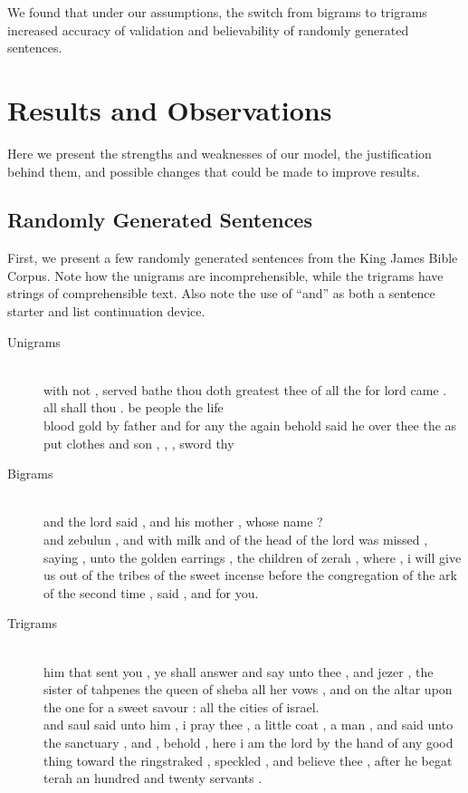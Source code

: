 \documentclass[12pt]{article}
\begin{document}
We found that under our assumptions, the switch from bigrams to trigrams increased accuracy of validation and believability of randomly generated sentences.

\section{Results and Observations}
Here we present the strengths and weaknesses of our model, the justification behind them, and possible changes that could be made to improve results.

\subsection{Randomly Generated Sentences}
First, we present a few randomly generated sentences from the King James Bible Corpus. Note how the unigrams are incomprehensible, while the trigrams have strings of comprehensible text. Also note the  use of ``and'' as both a sentence starter and list continuation device.
\begin{description}
\item[Unigrams]\hfill\\
with not , served bathe thou doth greatest thee of all the for lord came . all shall thou . be people the life
\\
blood gold by father and for any the again behold said he over thee the as put clothes and son , , , sword thy
\item[Bigrams]\hfill\\
and the lord said , and his mother , whose name ?
\\
and zebulun , and with milk and of the head of the lord was missed , saying , unto the golden earrings , the children of zerah , where , i will give us out of the tribes of the sweet incense before the congregation of the ark of the second time , said , and for you.
\item[Trigrams]\hfill\\
him that sent you , ye shall answer and say unto thee , and jezer , the sister of tahpenes the queen of sheba all her vows , and on the altar upon the one for a sweet savour : all the cities of israel.
\\
and saul said unto him , i pray thee , a little coat , a man , and said unto the sanctuary , and , behold , here i am the lord by the hand of any good thing toward the ringstraked , speckled , and believe thee , after he begat terah an hundred and twenty servants .
\end{description}
\end{document}
